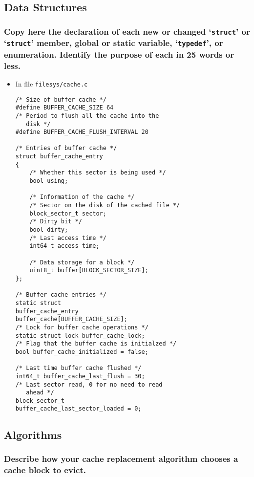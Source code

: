 \documentclass[sigconf, nonacm, balance=false, urlbreakonhyphens=true]{acmart}
\begin{document}
        \subsection{Data Structures}
            
            \subsubsection{Copy here the declaration of each new or changed `\texttt{struct}' or `\texttt{struct}' member, global or static variable, `\texttt{typedef}', or enumeration. Identify the purpose of each in 25 words or less. }
    
            \begin{itemize}
                \item In file \texttt{filesys/cache.c}
\begin{verbatim}
/* Size of buffer cache */
#define BUFFER_CACHE_SIZE 64
/* Period to flush all the cache into the 
   disk */
#define BUFFER_CACHE_FLUSH_INTERVAL 20

/* Entries of buffer cache */
struct buffer_cache_entry
{
    /* Whether this sector is being used */
    bool using;

    /* Information of the cache */
    /* Sector on the disk of the cached file */
    block_sector_t sector;
    /* Dirty bit */
    bool dirty;
    /* Last access time */
    int64_t access_time;

    /* Data storage for a block */
    uint8_t buffer[BLOCK_SECTOR_SIZE];
};

/* Buffer cache entries */
static struct 
buffer_cache_entry 
buffer_cache[BUFFER_CACHE_SIZE];
/* Lock for buffer cache operations */
static struct lock buffer_cache_lock;
/* Flag that the buffer cache is initialzed */
bool buffer_cache_initialized = false;

/* Last time buffer cache flushed */
int64_t buffer_cache_last_flush = 30;
/* Last sector read, 0 for no need to read 
   ahead */
block_sector_t 
buffer_cache_last_sector_loaded = 0;
\end{verbatim}
            \end{itemize}

        \subsection{Algorithms}

            \subsubsection{Describe how your cache replacement algorithm chooses a cache block to evict. } 
\end{document}
